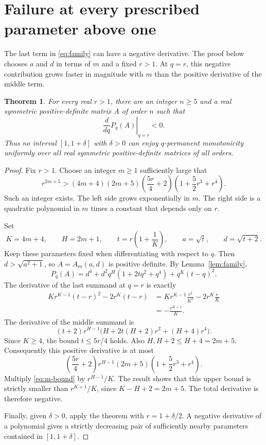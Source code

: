 \documentclass[11pt]{article}
\newtheorem{theorem}{Theorem}
\begin{document}
\section{Failure at every prescribed parameter above one}
The last term in \eqref{eq:family} can have a negative derivative.
The proof below chooses $a$ and $d$ in terms of $m$ and a fixed $r>1$.
At $q=r$, this negative contribution grows faster in magnitude with $m$
than the positive derivative of the middle term.
\begin{theorem}\label{thm:allq}
For every real $r>1$, there are an integer $n\ge5$ and a real symmetric positive-definite matrix $A$ of order $n$ such that
\[
 \left.\frac{d}{dq}P_q(A)\right|_{q=r}<0.
\]
Thus no interval $[1,1+\delta]$ with $\delta>0$ can enjoy $q$-permanent monotonicity uniformly over all real symmetric positive-definite matrices of all orders.
\end{theorem}
\begin{proof}
Fix $r>1$. Choose an integer $m\ge1$ sufficiently large that
\begin{equation}\label{eq:m-bound}
 r^{2m+5}>
 (4m+4)(2m+5)\left(\frac{5r}{4}+2\right)
 \left(1+\frac52r^3+r^4\right).
\end{equation}
Such an integer exists. The left side grows exponentially in $m$. The right side is a quadratic polynomial in $m$ times a constant that depends only on $r$.

Set
\[
 K=4m+4,\qquad H=2m+1,\qquad
 t=r\left(1+\frac1K\right),\qquad
 a=\sqrt{t},\qquad d=\sqrt{t+2}.
\]
Keep these parameters fixed when differentiating with respect to $q$. Then $d>\sqrt{a^2+1}$, so $A=A_m(a,d)$ is positive definite. By Lemma~\ref{lem:family},
\[
 P_q(A)=d^4+d^2q^H(1+2tq^2+q^4)+q^K(t-q)^2.
\]
The derivative of the last summand at $q=r$ is exactly
\begin{align*}
 Kr^{K-1}(t-r)^2-2r^K(t-r)
 &=Kr^{K-1}\frac{r^2}{K^2}-2r^K\frac rK\\
 &=-\frac{r^{K+1}}K.
\end{align*}
The derivative of the middle summand is
\[
 (t+2)r^{H-1}\bigl(H+2t(H+2)r^2+(H+4)r^4\bigr).
\]
Since $K\ge4$, the bound $t\le5r/4$ holds. Also $H,H+2\le H+4=2m+5$. Consequently this positive derivative is at most
\[
 \left(\frac{5r}{4}+2\right)r^{H-1}(2m+5)
 \left(1+\frac52r^3+r^4\right).
\]
Multiply \eqref{eq:m-bound} by $r^{H-1}/K$. The result shows that this upper bound is strictly smaller than $r^{K+1}/K$, since $K-H+2=2m+5$. The total derivative is therefore negative.

Finally, given $\delta>0$, apply the theorem with $r=1+\delta/2$. A negative derivative of a polynomial gives a strictly decreasing pair of sufficiently nearby parameters contained in $[1,1+\delta]$.
\end{proof}
\end{document}
